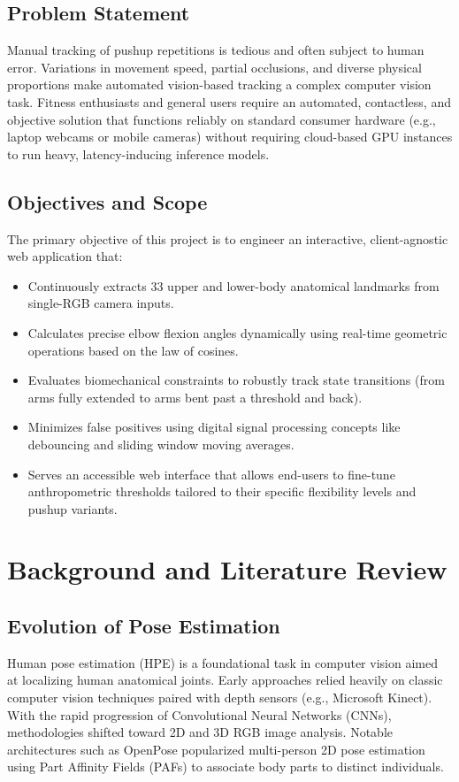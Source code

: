\documentclass[12pt, a4paper]{article}
\begin{document}
\subsection{Problem Statement}
Manual tracking of pushup repetitions is tedious and often subject to human error. Variations in movement speed, partial occlusions, and diverse physical proportions make automated vision-based tracking a complex computer vision task. Fitness enthusiasts and general users require an automated, contactless, and objective solution that functions reliably on standard consumer hardware (e.g., laptop webcams or mobile cameras) without requiring cloud-based GPU instances to run heavy, latency-inducing inference models.

\subsection{Objectives and Scope}
The primary objective of this project is to engineer an interactive, client-agnostic web application that:
\begin{itemize}
    \item Continuously extracts 33 upper and lower-body anatomical landmarks from single-RGB camera inputs.
    \item Calculates precise elbow flexion angles dynamically using real-time geometric operations based on the law of cosines.
    \item Evaluates biomechanical constraints to robustly track state transitions (from arms fully extended to arms bent past a threshold and back).
    \item Minimizes false positives using digital signal processing concepts like debouncing and sliding window moving averages.
    \item Serves an accessible web interface that allows end-users to fine-tune anthropometric thresholds tailored to their specific flexibility levels and pushup variants.
\end{itemize}


\section{Background and Literature Review}

\subsection{Evolution of Pose Estimation}
Human pose estimation (HPE) is a foundational task in computer vision aimed at localizing human anatomical joints. Early approaches relied heavily on classic computer vision techniques paired with depth sensors (e.g., Microsoft Kinect). With the rapid progression of Convolutional Neural Networks (CNNs), methodologies shifted toward 2D and 3D RGB image analysis. Notable architectures such as OpenPose popularized multi-person 2D pose estimation using Part Affinity Fields (PAFs) to associate body parts to distinct individuals.
\end{document}
